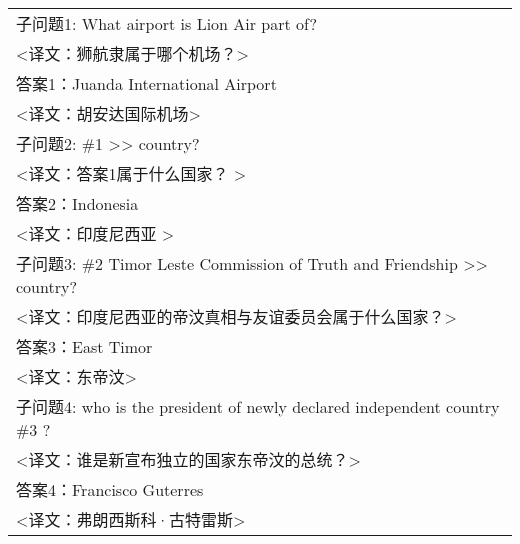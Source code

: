 \begin{table}[htbp]
\begin{tabular}{p{420pt}}
    \hline
    子问题1: What airport is Lion Air part of? \\
    <译文：狮航隶属于哪个机场？> \\
    答案1：Juanda International Airport \\
    <译文：胡安达国际机场> \\
    \hline
    子问题2: \#1 >> country? \\
    <译文：答案1属于什么国家？ > \\
    答案2：Indonesia \\
    <译文：印度尼西亚 > \\
    \hline
    子问题3: \#2 Timor Leste Commission of Truth and Friendship >> country? \\
    <译文：印度尼西亚的帝汶真相与友谊委员会属于什么国家？> \\
    答案3：East Timor \\
    <译文：东帝汶> \\
    \hline
    子问题4: who is the president of newly declared independent country \#3 ? \\
    <译文：谁是新宣布独立的国家东帝汶的总统？> \\
    答案4：Francisco Guterres \\
    <译文：弗朗西斯科·古特雷斯> \\
    \hline
    \end{tabular}
    \label{tab:5-1}
\end{table}
